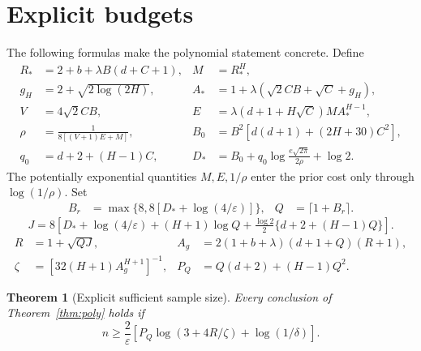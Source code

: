 \documentclass[11pt]{article}
\newtheorem{theorem}{Theorem}
\begin{document}
\section{Explicit budgets}
The following formulas make the polynomial statement concrete. Define
\begin{align*}
 R_*&=2+b+\lambda B(d+C+1),& M&=R_*^H,\\
 g_H&=2+\sqrt{2\log(2H)},&
 A_*&=1+\lambda(\sqrt2 CB+\sqrt C+g_H),\\
 V&=4\sqrt2 CB,&
 E&=\lambda(d+1+H\sqrt C)M A_*^{H-1},\\
 \rho&=\frac1{8[(V+1)E+M]},&
 B_0&=B^2[d(d+1)+(2H+30)C^2],\\
 q_0&=d+2+(H-1)C,&
 D_*&=B_0+q_0\log\frac{e\sqrt{2\pi}}{2\rho}+\log2.
\end{align*}
The potentially exponential quantities $M,E,1/\rho$ enter the prior
cost only through $\log(1/\rho)$. Set
\begin{align*}
 B_{r}&=\max\{8,8[D_*+\log(4/\varepsilon)]\},&
 Q&=\lceil1+B_{r}\rceil.
\end{align*}
\[
 J=8\left[D_*+\log(4/\varepsilon)+(H+1)\log Q
       +\tfrac{\log2}{2}\{d+2+(H-1)Q\}\right].
\]
\begin{align*}
 R&=1+\sqrt{QJ},&
 A_g&=2(1+b+\lambda)(d+1+Q)(R+1),\\
 \zeta&=[32(H+1)A_g^{H+1}]^{-1},&
 P_Q&=Q(d+2)+(H-1)Q^2.
\end{align*}

\begin{theorem}[Explicit sufficient sample size]\label{thm:explicit}
Every conclusion of Theorem~\ref{thm:poly} holds if
\begin{equation}\label{eq:explicit}
 n\ge\frac2\varepsilon
       \left[P_Q\log(3+4R/\zeta)+\log(1/\delta)\right].
\end{equation}
\end{theorem}
\end{document}

